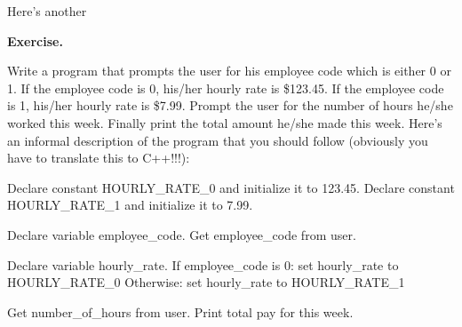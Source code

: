 Here's another

\textbf{Exercise.}
\begin{ex}
 Write a program that prompts the user for his
employee code which is either 0 or 1. If the employee code is 0, his/her
hourly rate is \$123.45. If the employee code is 1, his/her hourly rate
is \$7.99. Prompt the user for the number of hours he/she worked this
week. Finally print the total amount he/she made this week.
Here's an informal description of the program that you
should follow (obviously you have to translate this to C++!!!):
\begin{console}
Declare constant HOURLY_RATE_0 and initialize it to 123.45.
Declare constant HOURLY_RATE_1 and initialize it to 7.99.

Declare variable employee_code.
Get employee_code from user.

Declare variable hourly_rate.
If employee_code is 0:
   set hourly_rate to HOURLY_RATE_0
Otherwise:
        set hourly_rate to HOURLY_RATE_1
        
Get number_of_hours from user.
Print total pay for this week.
\end{console}
\end{ex}

\newpage{}

